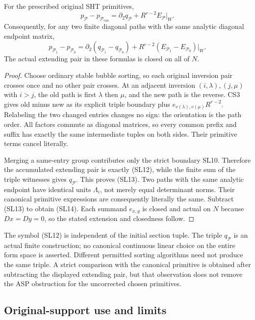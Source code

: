 \begin{theorem}
For the prescribed original SHT primitives,
\[
 p_{\mathcal P}-p_{\mathcal P_{\mathrm{can}}}
        =\partial_2q_{\mathcal P}+R^{r-2}E_{\mathcal P}|_W.
 \tag{SL13}
\]
Consequently, for any two finite diagonal paths with the same
analytic diagonal endpoint matrix,
\[
 p_{\mathcal P_1}-p_{\mathcal P_0}
    =\partial_2(q_{\mathcal P_1}-q_{\mathcal P_0})
                  +R^{r-2}(E_{\mathcal P_1}-E_{\mathcal P_0})|_W .
 \tag{SL14}
\]
The actual extending pair in these formulas is closed on all of $N$.
\end{theorem}

\begin{proof}
Choose ordinary stable bubble sorting, so each original inversion
pair crosses once and no other pair crosses.  At an adjacent
inversion $(i,\lambda),(j,\mu)$ with $i>j$, the old path is
first $\lambda$ then $\mu$, and the new path is the reverse.
CS3 gives old minus new as its explicit triple boundary plus
$e_{v(\lambda),v(\mu)}R^{r-2}$.  Relabeling the two changed
entries changes no sign: the orientation is the path order.
All factors commute as diagonal matrices, so every common
prefix and suffix has exactly the same intermediate tuples
on both sides.  Their primitive terms cancel literally.

Merging a same-entry group contributes only the strict boundary
SL10.  Therefore the accumulated extending pair is exactly
(SL12), while the finite sum of the triple witnesses gives
$q_{\mathcal P}$.  This proves (SL13).  Two paths with the same
analytic endpoint have identical units $\Lambda_i$, not merely
equal determinant norms.  Their canonical primitive expressions
are consequently literally the same.  Subtract (SL13) to obtain
(SL14).  Each summand $e_{x,y}$ is closed and actual on $N$
because $Dx=Dy=0$, so the stated extension and closedness follow.
\end{proof}

The symbol (SL12) is independent of the initial section tuple.
The triple $q_{\mathcal P}$ is an actual finite construction;
no canonical continuous linear choice on the entire form space
is asserted.  Different permitted sorting algorithms need not
produce the same triple.  A strict comparison with the canonical
primitive is obtained after subtracting the displayed extending
pair, but that observation does not remove the ASP obstruction
for the uncorrected chosen primitives.

\subsection{Original-support use and limits}

